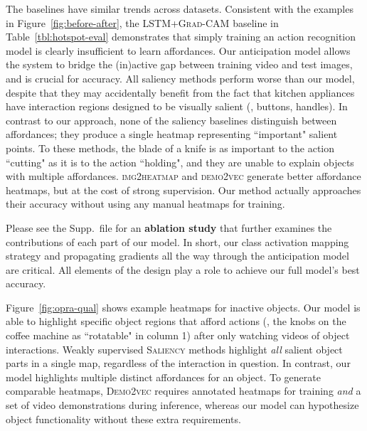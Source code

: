 \documentclass[10pt,twocolumn,letterpaper]{article}
\newcommand{\SC}[1]{{\textsc{#1}}}
\newcommand{\reffig}[1]{Figure~\ref{#1}}
\newcommand{\reftbl}[1]{Table~\ref{#1}}
\begin{document}
The baselines have similar trends across datasets. Consistent with the examples in \reffig{fig:before-after}, the \SC{LSTM+Grad-CAM} baseline in \reftbl{tbl:hotspot-eval} demonstrates  that simply training an action recognition model is clearly insufficient to learn affordances. Our anticipation model allows the system to bridge the (in)active gap between training video and test images, and is crucial for accuracy. 
All saliency methods perform worse than our model, despite that they may accidentally benefit from the fact that kitchen appliances have interaction regions designed to be visually salient (\eg, buttons, handles). 
In contrast to our approach, none of the saliency baselines distinguish between affordances; they produce a single heatmap representing ``important" salient points. To these methods, the blade of a knife is as important to the action ``cutting" as it is to the action ``holding", and they are unable to explain objects with multiple affordances.
\SC{img2heatmap} and \SC{demo2vec} generate better affordance heatmaps, but at the cost of strong supervision. Our method actually approaches their accuracy without using any manual heatmaps for training.

Please see the Supp.~file for an \textbf{ablation study} that further examines the contributions of each part of our model.  In short, our class activation mapping strategy and propagating gradients all the way through the anticipation model are critical. All elements of the design play a role to achieve our full model's best accuracy.


\reffig{fig:opra-qual} shows example heatmaps for inactive objects. Our model is able to highlight specific object regions that afford actions (\eg, the knobs on the coffee machine as ``rotatable" in column 1) after only watching videos of object interactions. Weakly supervised \SC{Saliency} methods highlight \emph{all} salient object parts in a single map, regardless of the interaction in question. 
In contrast, our model
highlights multiple distinct affordances for an object. To generate comparable heatmaps, \SC{Demo2vec} requires annotated heatmaps for training \emph{and} a set of video demonstrations during inference, whereas our model can hypothesize object functionality without these extra requirements.  
\end{document}
